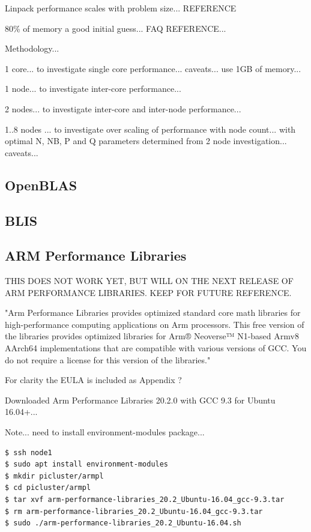 \documentclass{article}
\begin{document}
Linpack performance scales with problem size... REFERENCE

80\% of memory a good initial guess... FAQ REFERENCE...


Methodology...

1 core... to investigate single core performance... caveats... use 1GB of memory...

1 node... to investigate inter-core performance...

2 nodes... to investigate inter-core and inter-node performance...

1..8 nodes ... to investigate over scaling of performance with node count... with optimal N, NB, P and Q parameters determined from 2 node investigation... caveats...



\subsection{OpenBLAS}



\subsection{BLIS}



\subsection{ARM Performance Libraries}

THIS DOES NOT WORK YET, BUT WILL ON THE NEXT RELEASE OF ARM PERFORMANCE LIBRARIES. KEEP FOR FUTURE REFERENCE.

"Arm Performance Libraries provides optimized standard core math libraries for high-performance computing applications on Arm processors. This free version of the libraries provides optimized libraries for Arm® Neoverse™ N1-based Armv8 AArch64 implementations that are compatible with various versions of GCC. You do not require a license for this version of the libraries."

For clarity the EULA is included as Appendix ?

Downloaded Arm Performance Libraries 20.2.0 with GCC 9.3 for Ubuntu 16.04+...

Note... need to install environment-modules package...

\begin{lstlisting}[]
$ ssh node1
$ sudo apt install environment-modules
$ mkdir picluster/armpl
$ cd picluster/armpl
$ tar xvf arm-performance-libraries_20.2_Ubuntu-16.04_gcc-9.3.tar
$ rm arm-performance-libraries_20.2_Ubuntu-16.04_gcc-9.3.tar
$ sudo ./arm-performance-libraries_20.2_Ubuntu-16.04.sh
\end{lstlisting}
\end{document}
